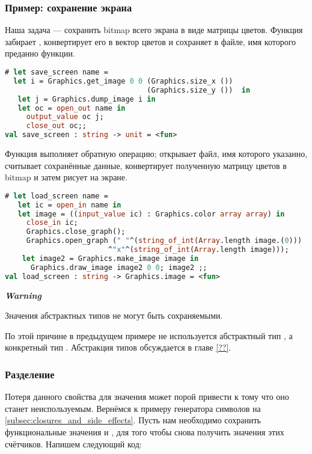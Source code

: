 \subsubsection{Пример: сохранение экрана}
\label{subsubsec:example_backup_screens}

Наша задача --- сохранить bitmap всего экрана в виде матрицы цветов. Функция 
 забирает , конвертирует его в вектор цветов и 
сохраняет в файле, имя которого преданно функции.

\begin{lstlisting}[language=OCaml]
# let save_screen name = 
  let i = Graphics.get_image 0 0 (Graphics.size_x ()) 
                                 (Graphics.size_y ())  in 
   let j = Graphics.dump_image i in 
   let oc = open_out name in 
     output_value oc j;
     close_out oc;;
val save_screen : string -> unit = <fun>
\end{lstlisting}

Функция  выполняет обратную операцию; открывает файл, имя 
которого указанно, считывает сохранённые данные, конвертирует полученную 
матрицу цветов в bitmap и затем рисует на экране.

\begin{lstlisting}[language=OCaml]
# let load_screen name = 
   let ic = open_in name in 
   let image = ((input_value ic) : Graphics.color array array) in
     close_in ic;
     Graphics.close_graph();
     Graphics.open_graph (" "^(string_of_int(Array.length image.(0)))
                        ^"x"^(string_of_int(Array.length image)));
    let image2 = Graphics.make_image image in 
      Graphics.draw_image image2 0 0; image2 ;;
val load_screen : string -> Graphics.image = <fun>
\end{lstlisting}

{\it \bf Warning}

Значения абстрактных типов не могут быть сохраняемыми.

По этой причине в предыдущем примере не используется абстрактный тип 
, а конкретный тип . Абстракция 
типов обсуждается в главе \ref{??}.

\subsubsection{Разделение}
\label{subsubsec:sharing}

Потеря данного свойства для значения может порой привести к тому что оно станет 
неиспользуемым. Вернёмся к примеру генератора символов на 
\ref{subsec:closures_and_side_effects}. Пусть нам необходимо сохранить 
функциональные значения  и , для того чтобы снова 
получить значения этих счётчиков. Напишем следующий код:

